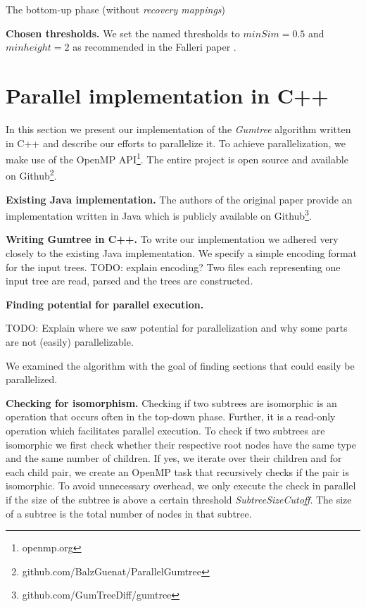 \documentclass[letterpaper]{article}
\newcommand{\mypar}[1]{{\bf #1.}}
\begin{document}
\begin{algorithm}
\caption{The bottom-up phase (without \emph{recovery mappings})}
\label{alg:bottom-up}
\end{algorithm}

\mypar{Chosen thresholds}
We set the named thresholds to $minSim=0.5$ and $minheight=2$ as recommended in the Falleri paper \cite{falleri:2014:structure_diff}.

\section{Parallel implementation in C++}\label{sec:yourmethod}

In this section we present our implementation of the \emph{Gumtree} algorithm written in C++ and describe our efforts to parallelize it.
To achieve parallelization, we make use of the OpenMP API\footnote{openmp.org}.
The entire project is open source and available on Github\footnote{github.com/BalzGuenat/ParallelGumtree}.

\mypar{Existing Java implementation}
The authors of the original paper provide an implementation written in Java which is publicly available on Github\footnote{github.com/GumTreeDiff/gumtree}.

\mypar{Writing Gumtree in C++}
To write our implementation we adhered very closely to the existing Java implementation.
We specify a simple encoding format for the input trees.
TODO: explain encoding?
Two files each representing one input tree are read, parsed and the trees are constructed.

\mypar{Finding potential for parallel execution}

TODO: Explain where we saw potential for parallelization and why some parts are not (easily) parallelizable.

We examined the algorithm with the goal of finding sections that could easily be parallelized.

\mypar{Checking for isomorphism}
Checking if two subtrees are isomorphic is an operation that occurs often in the top-down phase.
Further, it is a read-only operation which facilitates parallel execution.
To check if two subtrees are isomorphic we first check whether their respective root nodes have the same type and the same number of children.
If yes, we iterate over their children and for each child pair, we create an OpenMP task that recursively checks if the pair is isomorphic.
To avoid unnecessary overhead, we only execute the check in parallel if the size of the subtree is above a certain threshold \emph{SubtreeSizeCutoff}.
The size of a subtree is the total number of nodes in that subtree.
\end{document}
